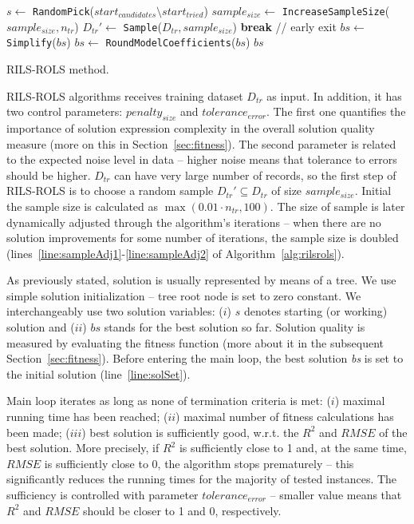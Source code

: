 \documentclass[a4paper,12pt]{elsarticle}
\begin{document}
\begin{algorithm}
\begin{algorithmic}[1]
   				\EndIf
   				\State $s \gets $ \texttt{RandomPick}($start_{candidates} \setminus start_{tried}$) \label{line:randPick}
   					\State $sample_{size} \gets$ \texttt{IncreaseSampleSize}($sample_{size}, n_{tr}$) \label{line:sampleAdj1}
   					\State $D_{tr}' \gets$ \texttt{Sample}($D_{tr}, sample_{size}$)\label{line:sampleAdj2}
   				\EndIf
   			\EndIf
   				\State \textbf{break} // early exit
   			\EndIf
   		\EndWhile
   		\State $bs \gets $ \texttt{Simplify}($bs$)
   		\State $bs \gets $ \texttt{RoundModelCoefficients}($bs$)
   		\State \Return $bs$
   		\EndProcedure
   	\end{algorithmic}
   	\caption{RILS-ROLS method.}
   	\label{alg:rilsrols}
   \end{algorithm}  

RILS-ROLS algorithms receives training dataset $D_{tr}$ as input. In addition, it has two control parameters: $penalty_{size}$ and $tolerance_{error}$. The first one quantifies the importance of solution expression complexity in the overall solution quality measure (more on this in Section~\ref{sec:fitness}). The second parameter is related to the expected noise level in data -- higher noise means that tolerance to errors should be higher.
 $D_{tr}$ can have very large number of records, so the first step of RILS-ROLS is to choose a random sample $D_{tr}' \subseteq D_{tr}$ of size $sample_{size}$. Initial the sample size is calculated as $\max(0.01 \cdot n_{tr}, 100)$. The size of sample is later dynamically adjusted through the algorithm's iterations -- when there are no solution improvements for some number of iterations, the sample size is doubled (lines~\ref{line:sampleAdj1}-\ref{line:sampleAdj2} of Algorithm~\ref{alg:rilsrols}).


As previously stated, solution is usually represented by means of a tree. We use simple solution initialization -- tree root node is set to zero constant. We interchangeably use two solution variables: ($i$) $s$ denotes starting (or working) solution and ($ii$) $bs$ stands for the best solution so far. Solution quality is measured by evaluating the fitness function (more about it in the subsequent Section~\ref{sec:fitness}). Before entering the main loop, the best solution \emph{bs} is set to the initial solution (line~\ref{line:solSet}).


Main loop iterates as long as none of termination criteria is met: ($i$) maximal running time has been reached; ($ii$) maximal number of fitness calculations has been made; ($iii$) best solution is sufficiently good, 
w.r.t. the $R^2$ and $RMSE$ of the best solution. More precisely, if $R^2$ is sufficiently close to 1 and, at the same time, $RMSE$ is sufficiently close to 0, the algorithm stops prematurely -- this significantly reduces the running times for the majority of tested instances.
The sufficiency is controlled with parameter $tolerance_{error}$ -- smaller value means that $R^2$ and $RMSE$ should be closer to 1 and 0, respectively. 
\end{document}
